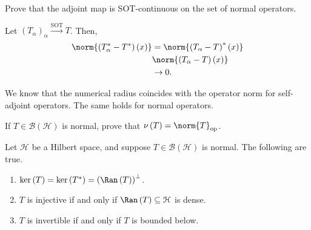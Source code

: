 \documentclass[10pt]{mypackage}
\begin{document}
\begin{exercise}
  Prove that the adjoint map is SOT-continuous on the set of normal operators.
\end{exercise}
\begin{solution}
  Let $\left(T_{\alpha}\right)_{\alpha} \xrightarrow{\text{SOT}} T$. Then,
  \begin{align*}
    \norm{\left(T_{\alpha}^{\ast}- T^{\ast}\right)\left(x\right)} &= \norm{\left(T_{\alpha} - T\right)^{\ast}\left(x\right)}\\ 
                                                               &\norm{\left(T_{\alpha} - T\right)\left(x\right)}\\
                                                               &\rightarrow 0.
  \end{align*}
\end{solution}
We know that the numerical radius coincides with the operator norm for self-adjoint operators. The same holds for normal operators.
\begin{exercise}
  If $T\in \mathcal{B}\left(\mathcal{H}\right)$ is normal, prove that $\nu\left(T\right) = \norm{T}_{\text{op}}$.
\end{exercise}
\begin{proposition}
  Let $\mathcal{H}$ be a Hilbert space, and suppose $T\in \mathcal{B}\left(\mathcal{H}\right)$ is normal. The following are true.
  \begin{enumerate}[(1)]
    \item $\ker\left(T\right) = \ker\left(T^{\ast}\right) = \left(\Ran\left(T\right)\right)^{\perp}$.
    \item $T$ is injective if and only if $\Ran\left(T\right)\subseteq \mathcal{H}$ is dense.
    \item $T$ is invertible if and only if $T$ is bounded below.
  \end{enumerate}
\end{proposition}
\end{document}
